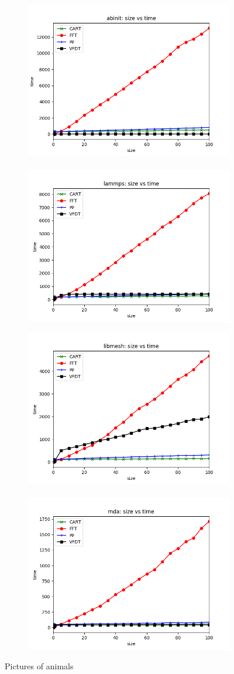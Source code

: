 \documentclass[sigplan]{acmart}\settopmatter{printfolios=true,printccs=false,printacmref=false}
\begin{document}
\begin{figure}
	\centering
	\begin{subfigure}[b]{\linewidth}
		\includegraphics[width=.49\linewidth]{fig/abinit-size-time.png} \ 
		\includegraphics[width=.49\linewidth]{fig/lammps-size-time.png}
	\end{subfigure}
	\begin{subfigure}[b]{\linewidth}
		\includegraphics[width=.49\linewidth]{fig/libmesh-size-time.png} \ 
		\includegraphics[width=.49\linewidth]{fig/mda-size-time.png}
	\end{subfigure}
	
	\caption{Pictures of animals}\label{fig:animals}
\end{figure}





%
%
\end{document}
